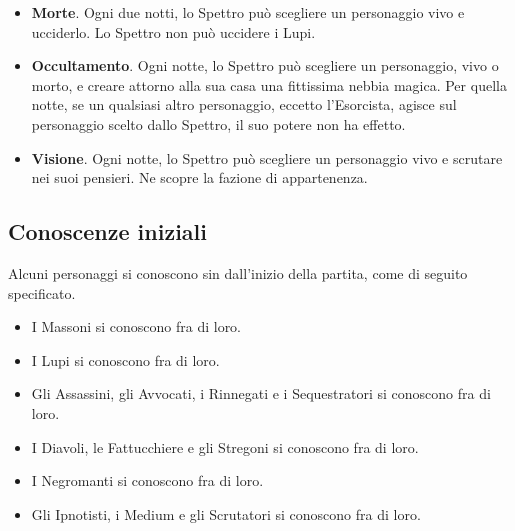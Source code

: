 \documentclass[a4paper,10pt]{article}
\begin{document}
\begin{itemize}

 
 \item {\bf Morte}. Ogni due notti, lo Spettro può scegliere un personaggio vivo e ucciderlo. Lo Spettro non può uccidere i Lupi. %
 
 \item {\bf Occultamento}. Ogni notte, lo Spettro può scegliere un personaggio, vivo o morto, e creare attorno alla sua casa una fittissima nebbia magica. Per quella notte, se un qualsiasi altro personaggio, eccetto l'Esorcista, agisce sul personaggio scelto dallo Spettro, il suo potere non ha effetto.
 
 \item {\bf Visione}. Ogni notte, lo Spettro può scegliere un personaggio vivo e scrutare nei suoi pensieri. Ne scopre la fazione di appartenenza.
 
\end{itemize}

\subsection{Conoscenze iniziali}

Alcuni personaggi si conoscono sin dall'inizio della partita, come di seguito specificato.

\begin{itemize}
 \item I Massoni si conoscono fra di loro.
 \item I Lupi si conoscono fra di loro.
 \item Gli Assassini, gli Avvocati, i Rinnegati e i Sequestratori si conoscono fra di loro.
 \item I Diavoli, le Fattucchiere e gli Stregoni si conoscono fra di loro.
 \item I Negromanti si conoscono fra di loro.
 \item Gli Ipnotisti, i Medium e gli Scrutatori si conoscono fra di loro.
\end{itemize}
\end{document}
